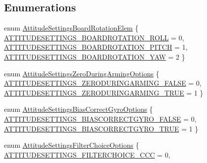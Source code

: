 \subsection*{\-Enumerations}
\begin{DoxyCompactItemize}
\item 
enum \hyperlink{group___attitude_settings_ga8c5e05985ba9bde77ac5d976dfc39e53}{\-Attitude\-Settings\-Board\-Rotation\-Elem} \{ \hyperlink{group___attitude_settings_gga8c5e05985ba9bde77ac5d976dfc39e53a8cb5ebebf78ec62675eac7bb2e2e5441}{\-A\-T\-T\-I\-T\-U\-D\-E\-S\-E\-T\-T\-I\-N\-G\-S\-\_\-\-B\-O\-A\-R\-D\-R\-O\-T\-A\-T\-I\-O\-N\-\_\-\-R\-O\-L\-L} = 0, 
\hyperlink{group___attitude_settings_gga8c5e05985ba9bde77ac5d976dfc39e53a106d216999319c9c2f064b50fc6845d5}{\-A\-T\-T\-I\-T\-U\-D\-E\-S\-E\-T\-T\-I\-N\-G\-S\-\_\-\-B\-O\-A\-R\-D\-R\-O\-T\-A\-T\-I\-O\-N\-\_\-\-P\-I\-T\-C\-H} = 1, 
\hyperlink{group___attitude_settings_gga8c5e05985ba9bde77ac5d976dfc39e53a9bea7f4bd0b2dd9155d00c4d5568a12a}{\-A\-T\-T\-I\-T\-U\-D\-E\-S\-E\-T\-T\-I\-N\-G\-S\-\_\-\-B\-O\-A\-R\-D\-R\-O\-T\-A\-T\-I\-O\-N\-\_\-\-Y\-A\-W} = 2
 \}
\item 
enum \hyperlink{group___attitude_settings_ga88cd3d87cffddd288cab219f5662cda1}{\-Attitude\-Settings\-Zero\-During\-Arming\-Options} \{ \hyperlink{group___attitude_settings_gga88cd3d87cffddd288cab219f5662cda1aece3e267947610a5bf619de14a1422e4}{\-A\-T\-T\-I\-T\-U\-D\-E\-S\-E\-T\-T\-I\-N\-G\-S\-\_\-\-Z\-E\-R\-O\-D\-U\-R\-I\-N\-G\-A\-R\-M\-I\-N\-G\-\_\-\-F\-A\-L\-S\-E} = 0, 
\hyperlink{group___attitude_settings_gga88cd3d87cffddd288cab219f5662cda1a6f33a99b3629d38c262ccb666718a940}{\-A\-T\-T\-I\-T\-U\-D\-E\-S\-E\-T\-T\-I\-N\-G\-S\-\_\-\-Z\-E\-R\-O\-D\-U\-R\-I\-N\-G\-A\-R\-M\-I\-N\-G\-\_\-\-T\-R\-U\-E} = 1
 \}
\item 
enum \hyperlink{group___attitude_settings_gab83e6a734b8035f678f6842fec277a24}{\-Attitude\-Settings\-Bias\-Correct\-Gyro\-Options} \{ \hyperlink{group___attitude_settings_ggab83e6a734b8035f678f6842fec277a24ad45a08568f036268b20552b5c54e78a6}{\-A\-T\-T\-I\-T\-U\-D\-E\-S\-E\-T\-T\-I\-N\-G\-S\-\_\-\-B\-I\-A\-S\-C\-O\-R\-R\-E\-C\-T\-G\-Y\-R\-O\-\_\-\-F\-A\-L\-S\-E} = 0, 
\hyperlink{group___attitude_settings_ggab83e6a734b8035f678f6842fec277a24a5912c2670fe5a1f37077592ed6739151}{\-A\-T\-T\-I\-T\-U\-D\-E\-S\-E\-T\-T\-I\-N\-G\-S\-\_\-\-B\-I\-A\-S\-C\-O\-R\-R\-E\-C\-T\-G\-Y\-R\-O\-\_\-\-T\-R\-U\-E} = 1
 \}
\item 
enum \hyperlink{group___attitude_settings_ga6b9ae34ea011b8f2288d6b8d02a38216}{\-Attitude\-Settings\-Filter\-Choice\-Options} \{ \hyperlink{group___attitude_settings_gga6b9ae34ea011b8f2288d6b8d02a38216ad34e8d14cae7384a9288cd53e1a199dd}{\-A\-T\-T\-I\-T\-U\-D\-E\-S\-E\-T\-T\-I\-N\-G\-S\-\_\-\-F\-I\-L\-T\-E\-R\-C\-H\-O\-I\-C\-E\-\_\-\-C\-C\-C} = 0, 

\end{DoxyCompactItemize}
